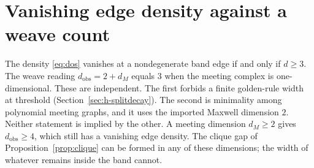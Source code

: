 \section{Vanishing edge density against a weave count}
\label{sec:h-why3}

The density \eqref{eq:dos} vanishes at a nondegenerate band edge if and only
if \(d\ge 3\).
The weave reading \(d_{\mathrm{obs}}=2+d_M\) equals \(3\) when the meeting
complex is one-dimensional.
These are independent.
The first forbids a finite golden-rule width at threshold
(Section~\ref{sec:h-splitdecay}).
The second is minimality among polynomial meeting graphs, and it uses the
imported Maxwell dimension \(2\).
Neither statement is implied by the other.
A meeting dimension \(d_M\ge 2\) gives \(d_{\mathrm{obs}}\ge 4\), which still
has a vanishing edge density.
The clique gap of Proposition~\ref{prop:clique} can be formed in any of
these dimensions; the width of whatever remains inside the band cannot.
